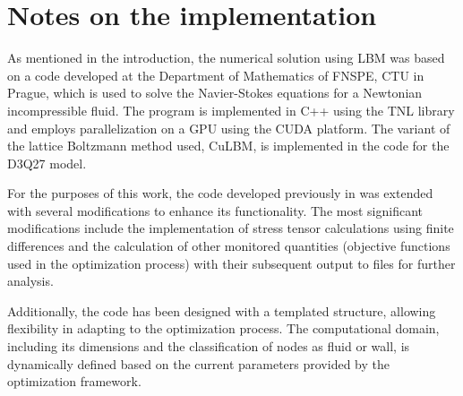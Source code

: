\section{Notes on the implementation}\label{notes on the LBM implementation}
As mentioned in the introduction, the numerical solution using LBM was based on a code developed at the Department of Mathematics of FNSPE, CTU in Prague, which is used to solve the Navier-Stokes equations for a Newtonian incompressible fluid. The program is implemented in C++ using the TNL library \cite{Oberhuber2021, Klinkovsky2022} and employs parallelization on a GPU using the CUDA platform. The variant of the lattice Boltzmann method used, CuLBM, is implemented in the code for the D3Q27 model.

For the purposes of this work, the code developed previously in \cite{buresBP, buresVU} was extended with several modifications to enhance its functionality. The most significant modifications include the implementation of stress tensor calculations using finite differences and the calculation of other monitored quantities (objective functions used in the optimization process) with their subsequent output to files for further analysis.

Additionally, the code has been designed with a templated structure, allowing flexibility in adapting to the optimization process. The computational domain, including its dimensions and the classification of nodes as fluid or wall, is dynamically defined based on the current parameters provided by the optimization framework.
